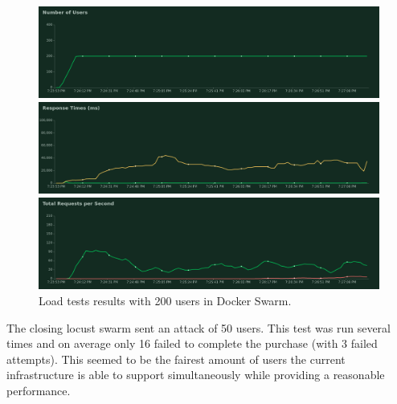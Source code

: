 \documentclass[12pt]{article}
\begin{document}
\begin{figure}[H]
  \centering
  \begin{minipage}{\textwidth}
    \centering
    \includegraphics[width=.95\linewidth]{tests/swarm/200/number_of_users_1588271033.png}
  \end{minipage}%
  \label{fig:LocalTests:number_of_users}
  \begin{minipage}{\textwidth}
    \centering
    \includegraphics[width=.95\linewidth]{tests/swarm/200/response_times_(ms)_1588271033.png}
  \end{minipage}%
  \label{fig:LocalTests:response_times_(ms)}
  \begin{minipage}{\textwidth}
    \centering
    \includegraphics[width=.95\linewidth]{tests/swarm/200/total_requests_per_second_1588271033.png}
  \end{minipage}%
  \caption{Load tests results with 200 users in Docker Swarm.}
  \label{fig:LocalTests:total_requests_per_second}
\end{figure}
\vspace{-10pt}

The closing locust swarm sent an attack of 50 users.
This test was run several times and on average only 16 failed to complete the purchase (with 3 failed attempts).
This seemed to be the fairest amount of users the current infrastructure is able to support simultaneously while providing a reasonable performance.
\end{document}
